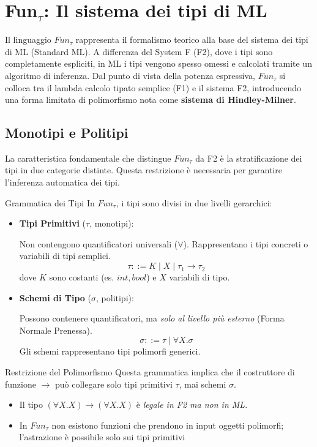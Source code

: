 \documentclass[a4paper,11pt]{report}
\begin{document}
\newpage

\section{Fun$_{\tau}$: Il sistema dei tipi di ML}

Il linguaggio $Fun_{\tau}$ rappresenta il formalismo teorico alla base del sistema dei tipi di ML (Standard ML). A differenza del System F (F2), dove i tipi sono completamente espliciti, in ML i tipi vengono spesso omessi e calcolati tramite un algoritmo di inferenza.
Dal punto di vista della potenza espressiva, $Fun_{\tau}$ si colloca tra il lambda calcolo tipato semplice (F1) e il sistema F2, introducendo una forma limitata di polimorfismo nota come \textbf{sistema di Hindley-Milner}.

\subsection{Monotipi e Politipi}
La caratteristica fondamentale che distingue $Fun_{\tau}$ da F2 è la stratificazione dei tipi in due categorie distinte. Questa restrizione è necessaria per garantire l'inferenza automatica dei tipi.

\begin{defframe}{Grammatica dei Tipi}{}
    In $Fun_{\tau}$, i tipi sono divisi in due livelli gerarchici:
    \begin{itemize}
    \item \textbf{Tipi Primitivi} ($\tau$, monotipi):
        
            Non contengono quantificatori universali ($\forall$). Rappresentano i tipi concreti o variabili di tipi semplici.
        \[ \tau ::= K \mid X \mid \tau_1 \to \tau_2 \]
        dove $K$ sono costanti (es. $int, bool$) e $X$ variabili di tipo.

\item \textbf{Schemi di Tipo} ($\sigma$, politipi):
        
            Possono contenere quantificatori, ma \textit{solo al livello più esterno} (Forma Normale Prenessa).
        \[ \sigma ::= \tau \mid \forall X.\sigma \]
        Gli schemi rappresentano tipi polimorfi generici.
    \end{itemize}

\begin{gframe}{Restrizione del Polimorfismo}
    Questa grammatica implica che il costruttore di funzione $\to$ può collegare solo tipi primitivi $\tau$, mai schemi $\sigma$.
    \begin{itemize}
        \item Il tipo $(\forall X.X) \to (\forall X.X)$ è \textit{legale in F2 ma non in ML}.
        \item In $Fun_{\tau}$ non esistono funzioni che prendono in input oggetti polimorfi; l'astrazione è possibile solo sui tipi primitivi 
    \end{itemize}
\end{gframe}
\end{defframe}
\end{document}
